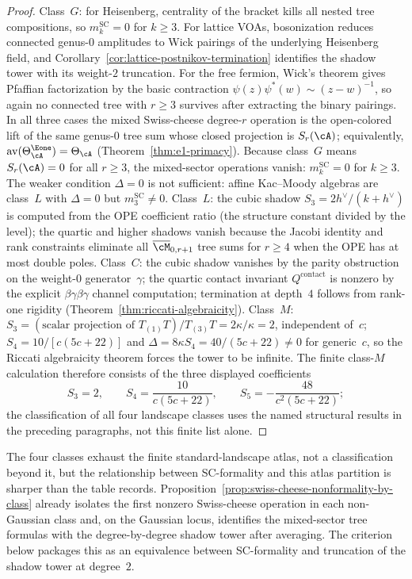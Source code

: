 \begin{proof}
Class~$G$: for Heisenberg, centrality of the bracket kills all nested
tree compositions, so $m_k^{\mathrm{SC}} = 0$ for $k \geq 3$.
For lattice VOAs, bosonization reduces connected genus-$0$ amplitudes
to Wick pairings of the underlying Heisenberg field, and
Corollary~\ref{cor:lattice-postnikov-termination} identifies the
shadow tower with its weight-$2$ truncation. For the free fermion,
Wick's theorem gives Pfaffian factorization by the basic contraction
$\psi(z)\psi^*(w) \sim (z-w)^{-1}$, so again no connected tree with
$r \geq 3$ survives after extracting the binary pairings. In all three
cases the mixed Swiss-cheese degree-$r$ operation is the open-colored
lift of the same genus-$0$ tree sum whose closed projection is
$S_r(\cA)$; equivalently,
$\operatorname{av}(\Theta_\cA^{\Eone}) = \Theta_\cA$
\textup{(}Theorem~\ref{thm:e1-primacy}\textup{)}.
Because class~$G$ means $S_r(\cA) = 0$ for all $r \geq 3$,
the mixed-sector operations vanish:
$m_k^{\mathrm{SC}} = 0$ for $k \geq 3$.
The weaker condition $\Delta = 0$ is not sufficient:
affine Kac--Moody algebras are class~$L$ with $\Delta = 0$ but
$m_3^{\mathrm{SC}} \neq 0$.
Class~$L$: the cubic shadow
$S_3 = 2h^\vee/(k + h^\vee)$ is computed from the OPE coefficient
ratio (the structure constant divided by the level); the quartic
and higher shadows vanish because the Jacobi identity and rank
constraints eliminate all $\overline{\cM}_{0,r+1}$ tree sums for
$r \geq 4$ when the OPE has at most double poles.
Class~$C$: the cubic shadow vanishes by the parity obstruction on
the weight-$0$ generator~$\gamma$; the quartic contact invariant
$Q^{\mathrm{contact}}$ is nonzero by the explicit
$\beta\gamma\beta\gamma$ channel computation; termination at
depth~$4$ follows from rank-one rigidity
(Theorem~\ref{thm:riccati-algebraicity}).
Class~$M$:
$S_3 = (\text{scalar projection of } T_{(1)}T)/T_{(3)}T
= 2\kappa/\kappa = 2$, independent of~$c$;
$S_4 = 10/[c(5c{+}22)]$ and $\Delta = 8\kappa S_4 = 40/(5c{+}22) \neq 0$
for generic~$c$, so the Riccati algebraicity theorem
forces the tower to be infinite.
The finite class-$M$ calculation therefore consists of the three
displayed coefficients
\[
 S_3=2,\qquad S_4=\frac{10}{c(5c+22)},\qquad
 S_5=-\frac{48}{c^2(5c+22)};
\]
the classification of all four landscape classes uses the named
structural results in the preceding paragraphs, not this finite list
alone.
\end{proof}

The four classes exhaust the finite standard-landscape atlas, not a
classification beyond it, but the relationship between SC-formality
and this atlas partition is sharper than the table records.
Proposition~\ref{prop:swiss-cheese-nonformality-by-class}
already isolates the first nonzero Swiss-cheese operation in each
non-Gaussian class and, on the Gaussian locus, identifies the
mixed-sector tree formulas with the degree-by-degree shadow tower
after averaging. The criterion below packages this as an equivalence
between SC-formality and truncation of the shadow tower at degree~$2$.

